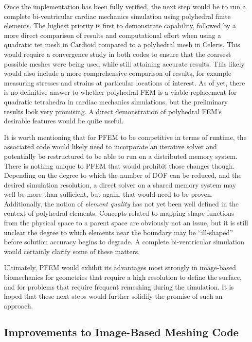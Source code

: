 Once the implementation has been fully verified, the next step would be to run a complete bi-ventricular cardiac mechanics simulation using polyhedral finite elements. The highest priority is first to demonstrate capability, followed by a more direct comparison of results and computational effort when using a quadratic tet mesh in Cardioid compared to a polyhedral mesh in Celeris. This would require a convergence study in both codes to ensure that the coarsest possible meshes were being used while still attaining accurate results. This likely would also include a more comprehensive comparison of results, for example measuring stresses and strains at particular locations of interest. As of yet, there is no definitive answer to whether polyhedral FEM is a viable replacement for quadratic tetrahedra in cardiac mechanics simulations, but the preliminary results look very promising. A direct demonstration of polyhedral FEM's desirable features would be quite useful.

It is worth mentioning that for PFEM to be competitive in terms of runtime, the associated code would likely need to incorporate an iterative solver and potentially be restructured to be able to run on a distributed memory system. There is nothing unique to PFEM that would prohibit those changes though. Depending on the degree to which the number of DOF can be reduced, and the desired simulation resolution, a direct solver on a shared memory system may well be more than sufficient, but again, that would need to be proven. Additionally, the notion of \textit{element quality} has not yet been well defined in the context of polyhedral elements. Concepts related to mapping shape functions from the physical space to a parent space are obviously not an issue, but it is still unclear the degree to which elements near the boundary may be ``ill-shaped'' before solution accuracy begins to degrade. A complete bi-ventricular simulation would certainly clarify some of these matters.

Ultimately, PFEM would exhibit its advantages most strongly in image-based biomechanics for geometries that require a high resolution to define the surface, and for problems that require frequent remeshing during the simulation. It is hoped that these next steps would further solidify the promise of such an approach.

\subsection{Improvements to Image-Based Meshing Code}
\label{Improvements to Image-Based Meshing Code}

